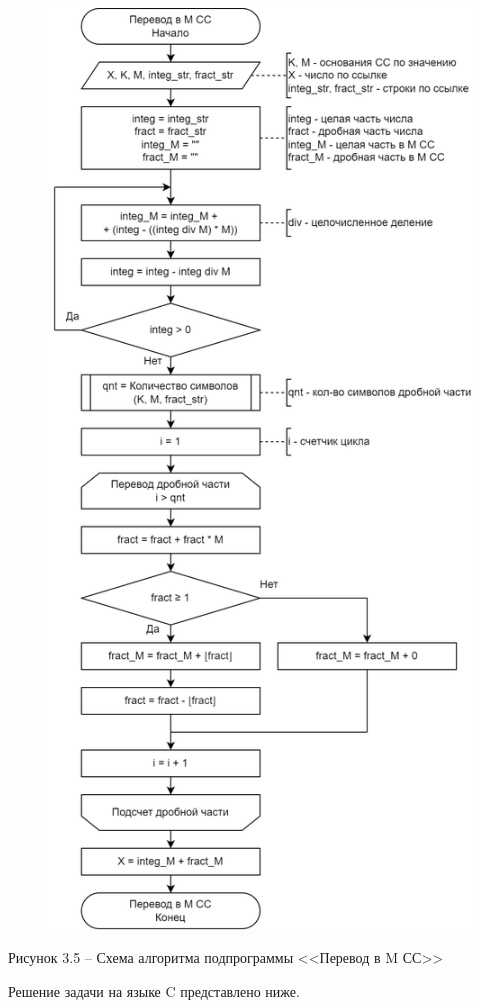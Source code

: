 \documentclass[a4paper,14pt]{extarticle}
\begin{document}
  \begin{figure}[h]
    \centering
    \includegraphics[width=0.54\linewidth]{schemes/s-3-5}
  \end{figure}
  \begin{center}
    Рисунок 3.5 – Схема алгоритма подпрограммы <<Перевод в M СС>>
  \end{center}
  \pagebreak

  Решение задачи на языке C представлено ниже.
\end{document}

